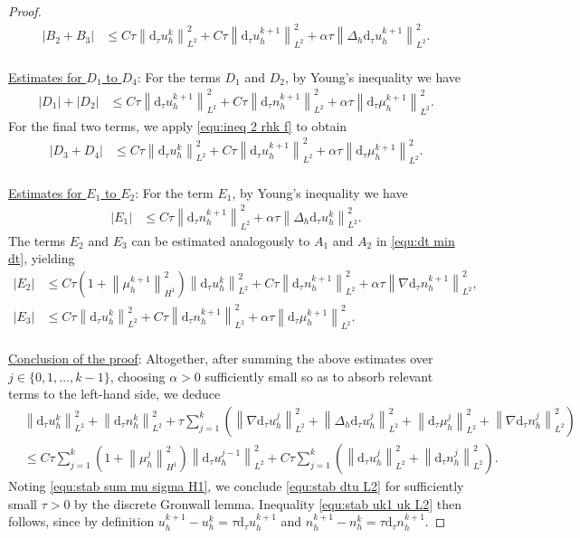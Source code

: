 \documentclass[11pt, reqno]{amsart}
\theoremstyle{definition}
\numberwithin{equation}{section}
\newcommand{\dtt}{\mathrm{d}_\tau}
\newcommand{\norm}[2]{\left\|{#1}\right\|_{#2}}
\newcommand{\abs}[1]{\left|{#1}\right|}
\begin{document}
\begin{proof}
\begin{align*}
	\abs{B_2+B_3}
	&\leq
	C\tau \norm{\dtt u_h^k}{L^2}^2
	+
	C\tau \norm{\dtt u_h^{k+1}}{L^2}^2
	+
	\alpha \tau \norm{\Delta_h \dtt u_h^{k+1}}{L^2}^2.
\end{align*}
\\
\underline{Estimates for $D_1$ to $D_4$}: For the terms $D_1$ and $D_2$, by Young's inequality we have
\begin{align*}
	\abs{D_1}+\abs{D_2}
	&\leq
	C\tau \norm{\dtt u_h^{k+1}}{L^2}^2 + C\tau \norm{\dtt n_h^{k+1}}{L^2}^2 + \alpha \tau \norm{\dtt \mu_h^{k+1}}{L^2}^2.
\end{align*}
For the final two terms, we apply \eqref{equ:ineq 2 rhk f} to obtain
\begin{align*}
	\abs{D_3+D_4}
	&\leq
	C\tau \norm{\dtt u_h^k}{L^2}^2
	+
	C\tau \norm{\dtt u_h^{k+1}}{L^2}^2
	+
	\alpha\tau \norm{{\dtt \mu_h^{k+1}}}{L^2}^2.
\end{align*}
\\
\underline{Estimates for $E_1$ to $E_2$}: For the term $E_1$, by Young's inequality we have
\begin{align*}
	\abs{E_1}
	&\leq
	C\tau \norm{\dtt n_h^{k+1}}{L^2}^2 + \alpha\tau \norm{\Delta_h \dtt u_h^k}{L^2}^2.
\end{align*}
The terms $E_2$ and $E_3$ can be estimated analogously to $A_1$ and $A_2$ in \eqref{equ:dt min dt}, yielding
\begin{align*}
	\abs{E_2}
	&\leq
	C\tau \left(1+\norm{\mu_h^{k+1}}{H^1}^2 \right) \norm{\dtt u_h^k}{L^2}^2
	+
	C\tau \norm{\dtt n_h^{k+1}}{L^2}^2
	+
	\alpha \tau \norm{\nabla \dtt n_h^{k+1}}{L^2}^2,
	\\
	\abs{E_3}
	&\leq
	C\tau \norm{\dtt u_h^k}{L^2}^2 + C\tau \norm{\dtt n_h^{k+1}}{L^2}^2 + \alpha\tau \norm{\dtt \mu_h^{k+1}}{L^2}^2.
\end{align*}
\\
\underline{Conclusion of the proof}: Altogether, after summing the above estimates over $j\in \{0,1,\ldots,k-1\}$, choosing $\alpha>0$ sufficiently small so as to absorb relevant terms to the left-hand side, we deduce
\begin{align*}
	&\norm{\dtt u_h^k}{L^2}^2
	+
	\norm{\dtt n_h^k}{L^2}^2
	+
	\tau \sum_{j=1}^k \left(\norm{\nabla \dtt u_h^j}{L^2}^2 + \norm{\Delta_h \dtt u_h^j}{L^2}^2 + \norm{\dtt \mu_h^j}{L^2}^2 + \norm{\nabla \dtt n_h^j}{L^2}^2 \right) 
	\\
	&\leq 
	C\tau \sum_{j=1}^k \left(1+\norm{\mu_h^j}{H^1}^2 \right) \norm{\dtt u_h^{j-1}}{L^2}^2
	+
	C\tau \sum_{j=1}^k \left(\norm{\dtt u_h^j}{L^2}^2+ \norm{\dtt n_h^j}{L^2}^2 \right).
\end{align*}
Noting \eqref{equ:stab sum mu sigma H1}, we conclude \eqref{equ:stab dtu L2} for sufficiently small $\tau>0$ by the discrete Gronwall lemma. Inequality \eqref{equ:stab uk1 uk L2} then follows, since by definition $u_h^{k+1}-u_h^k= \tau \dtt u_h^{k+1}$ and $n_h^{k+1}-n_h^k= \tau \dtt n_h^{k+1}$.
\end{proof}
\end{document}
